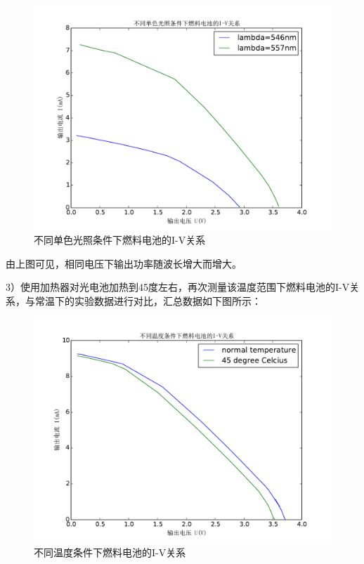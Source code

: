 ﻿\documentclass[10.5pt]{ctexart}
\begin{document}
\begin{figure}[!ht]
\centering
\caption{不同单色光照条件下燃料电池的I-V关系}
\includegraphics[width=400pt]{DifferentWaveLengthSolarCellOutput.pdf}
\end{figure}
由上图可见，相同电压下输出功率随波长增大而增大。
\newline

3）使用加热器对光电池加热到45度左右，再次测量该温度范围下燃料电池的I-V关系，与常温下的实验数据进行对比，汇总数据如下图所示：
\begin{figure}[!ht]
\centering
\caption{不同温度条件下燃料电池的I-V关系}
\includegraphics[width=400pt]{DifferentTemperatureSolarCellOutput.pdf}
\end{figure}
\end{document}
